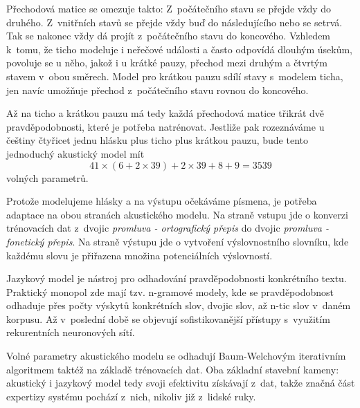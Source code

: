 Přechodová matice se omezuje takto: Z~počátečního stavu se přejde vždy do
druhého. Z~vnitřních stavů se přejde vždy buď do následujícího nebo se setrvá.
Tak se nakonec vždy dá projít z~počátečního stavu do koncového.
Vzhledem k~tomu, že ticho modeluje i neřečové události a často odpovídá dlouhým
úsekům, povoluje se u něho, jakož i u krátké pauzy, přechod mezi druhým a
čtvrtým stavem v~obou směrech. Model pro krátkou pauzu sdílí stavy s~modelem
ticha, jen navíc umožňuje přechod z~počátečního stavu rovnou do koncového.

Až na ticho a krátkou pauzu má tedy každá přechodová matice třikrát dvě
pravděpodobnosti, které je potřeba natrénovat.
Jestliže pak rozeznáváme u češtiny čtyřicet jednu hlásku plus ticho plus
krátkou pauzu, bude tento jednoduchý akustický model mít
\begin{equation}
41 \times (6 + 2 \times 39) + 2 \times 39 + 8 + 9 = 3539
\end{equation}
volných parametrů.

Protože modelujeme hlásky a na výstupu očekáváme písmena, je potřeba adaptace na
obou stranách akustického modelu. Na straně vstupu jde o konverzi trénovacích
dat z~dvojic {\em promluva - ortografický přepis} do dvojic {\em promluva -
fonetický přepis}. Na straně výstupu jde o vytvoření výslovnostního slovníku,
kde každému slovu je přiřazena množina potenciálních výslovností. %


Jazykový model je nástroj pro odhadování pravděpodobnosti konkrétního textu.
Praktický monopol zde mají tzv. n-gramové modely, kde se pravděpodobnost
odhaduje přes počty výskytů konkrétních slov, dvojic slov, až n-tic slov v~daném
korpusu. Až v~poslední době se objevují sofistikovanější přístupy s~využitím
rekurentních neuronových sítí.

Volné parametry akustického modelu se odhadují Baum-Welchovým iterativním
algoritmem\cite{welch2003hidden} taktéž na základě trénovacích dat. Oba základní stavební kameny:
akustický i jazykový model tedy svoji efektivitu získávají z~dat, takže značná
část expertizy systému pochází z~nich, nikoliv již z~lidské ruky.

